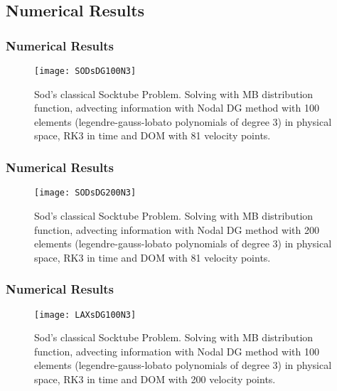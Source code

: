 \subsection{Numerical Results}

\begin{frame}
	\frametitle{Numerical Results}
			
		\begin{figure}
			\centering
				\texttt{[image: SODsDG100N3]}
			\caption{Sod's classical Socktube Problem. Solving with MB distribution function, advecting information with Nodal DG method with 100 elements (legendre-gauss-lobato polynomials of degree 3) in physical space, RK3 in time and DOM with 81 velocity points.}
			\label{fig:SODsDG100N3}
		\end{figure}
	
\end{frame}

\begin{frame}
	\frametitle{Numerical Results}
			
		\begin{figure}
			\centering
				\texttt{[image: SODsDG200N3]}
			\caption{Sod's classical Socktube Problem. Solving with MB distribution function, advecting information with Nodal DG method with 200 elements (legendre-gauss-lobato polynomials of degree 3) in physical space, RK3 in time and DOM with 81 velocity points.}
			\label{fig:SODsDG200N3}
		\end{figure}
	
\end{frame}

\begin{frame}
	\frametitle{Numerical Results}
			
		\begin{figure}
			\centering
				\texttt{[image: LAXsDG100N3]}
			\caption{Sod's classical Socktube Problem. Solving with MB distribution function, advecting information with Nodal DG method with 100 elements (legendre-gauss-lobato polynomials of degree 3) in physical space, RK3 in time and DOM with 200 velocity points.}
			\label{fig:LAXsDG100N3}
		\end{figure}
	
\end{frame}